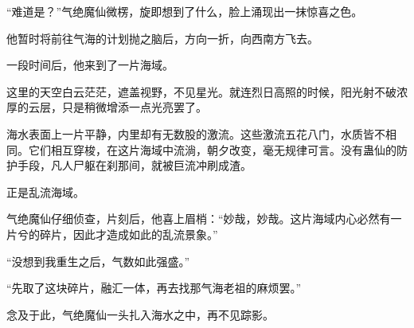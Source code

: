 \begin{this_body}
“难道是？”气绝魔仙微楞，旋即想到了什么，脸上涌现出一抹惊喜之色。

他暂时将前往气海的计划抛之脑后，方向一折，向西南方飞去。

一段时间后，他来到了一片海域。

这里的天空白云茫茫，遮盖视野，不见星光。就连烈日高照的时候，阳光射不破浓厚的云层，只是稍微增添一点光亮罢了。

海水表面上一片平静，内里却有无数股的激流。这些激流五花八门，水质皆不相同。它们相互穿梭，在这片海域中流淌，朝夕改变，毫无规律可言。没有蛊仙的防护手段，凡人尸躯在刹那间，就被巨流冲刷成渣。

正是乱流海域。

气绝魔仙仔细侦查，片刻后，他喜上眉梢：“妙哉，妙哉。这片海域内心必然有一片兮的碎片，因此才造成如此的乱流景象。”

“没想到我重生之后，气数如此强盛。”

“先取了这块碎片，融汇一体，再去找那气海老祖的麻烦罢。”

念及于此，气绝魔仙一头扎入海水之中，再不见踪影。

\end{this_body}

